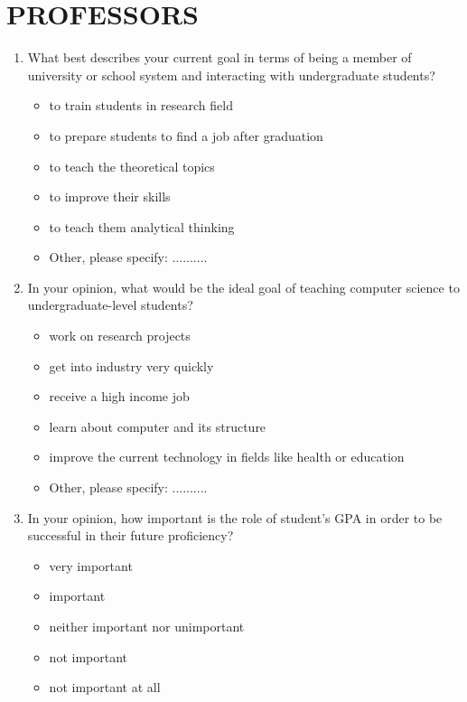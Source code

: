\documentclass[12pt,a4paper,titlepage]{article}
\begin{document}
\section{PROFESSORS}

\begin{enumerate}
	
	\item What best describes your current goal in terms of being a member of university or school system and interacting with undergraduate students?
	\begin{itemize}
		\item to train students in research field
		\item to prepare students to find a job after graduation
		\item to teach the theoretical topics
		\item to improve their skills
		\item to teach them analytical thinking
		\item Other, please specify: ..........
	\end{itemize}

	\item In your opinion, what would be the ideal goal of teaching computer science to undergraduate-level students?
	\begin{itemize}
		\item work on research projects
		\item get into industry very quickly
		\item receive a high income job
		\item learn about computer and its structure
		\item improve the current technology in fields like health or education
		\item Other, please specify: ..........
	\end{itemize}

	\item In your opinion, how important is the role of student’s GPA in order to be successful in their future proficiency?
	\begin{itemize}
		\item very important
		\item important
		\item neither important nor unimportant
		\item not important
		\item not important at all
	\end{itemize}


\end{enumerate}
\end{document}

